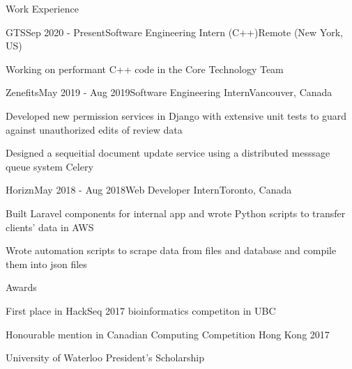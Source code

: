\documentclass{cv}
\begin{document}
\begin{rSection}{Work Experience}
\begin{rSubsection}{GTS}{Sep 2020 - Present}{Software Engineering Intern (C++)}{Remote (New York, US)}
	\item Working on performant C++ code in the Core Technology Team
\end{rSubsection}

\begin{rSubsection}{Zenefits}{May 2019 - Aug 2019}{Software Engineering Intern}{Vancouver, Canada}
	\item Developed new permission services in Django with extensive unit tests to guard against unauthorized edits of review data
	\item Designed a sequeitial document update service using a distributed messsage queue system Celery
\end{rSubsection}

\begin{rSubsection}{Horizn}{May 2018 - Aug 2018}{Web Developer Intern}{Toronto, Canada}
	\item Built Laravel components for internal app and wrote Python scripts to transfer clients’ data in AWS
	\item Wrote automation scripts to scrape data from files and database and compile them into json files
\end{rSubsection}
\end{rSection}

\begin{rSection}{Awards}
\begin{rSubsectionPure}
	\item First place in HackSeq 2017 bioinformatics competiton in UBC
	\item Honourable mention in Canadian Computing Competition Hong Kong 2017
	\item University of Waterloo President's Scholarship
\end{rSubsectionPure}
\end{rSection}
\end{document}
